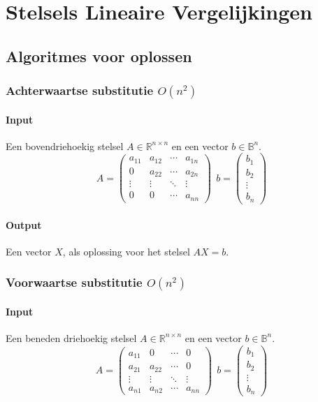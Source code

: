 \documentclass[samenvatting.tex]{subfiles}
\begin{document}
\chapter{Stelsels Lineaire Vergelijkingen}

\section{Algoritmes voor oplossen}
\subsection{Achterwaartse substitutie $O(n^2)$}
\subsubsection*{Input}
Een bovendriehoekig stelsel $A \in \mathbb{R}^{n\times n}$ en een vector $b \in \mathbb{B}^{n}$.
\[
A =
\begin{pmatrix}
a_{11} & a_{12} & \cdots & a_{1n}\\
0 & a_{22} & \cdots & a_{2n}\\
\vdots & \vdots & \ddots & \vdots\\
0 & 0 & \cdots & a_{nn}
\end{pmatrix}
\ { }\ 
b =
\begin{pmatrix}
b_{1}\\b_{2}\\\vdots\\b_{n}
\end{pmatrix}
\]
\subsubsection*{Output}
Een vector $X$, als oplossing voor het stelsel $AX=b$.

\subsection{Voorwaartse substitutie $O(n^2)$}
\subsubsection*{Input}
Een beneden driehoekig stelsel $A \in \mathbb{R}^{n\times n}$ en een vector $b \in \mathbb{B}^{n}$.
\[
A =
\begin{pmatrix}
a_{11} & 0 & \cdots & 0\\
a_{21} & a_{22} & \cdots & 0\\
\vdots & \vdots & \ddots & \vdots\\
a_{n1} & a_{n2} & \cdots & a_{nn}
\end{pmatrix}
\ { }\ 
b =
\begin{pmatrix}
b_{1}\\b_{2}\\\vdots\\b_{n}
\end{pmatrix}
\]
\end{document}
